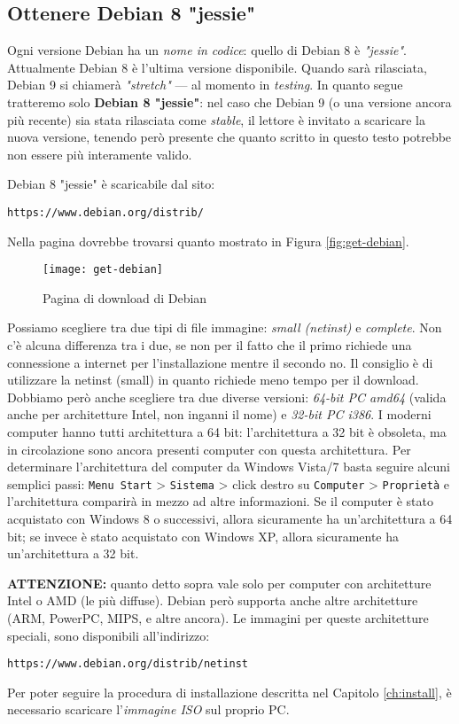\subsection{Ottenere Debian 8 "jessie"}
Ogni versione Debian ha un \textit{nome in codice}: quello di Debian 8 è \textit{"jessie"}. Attualmente Debian 8 è l'ultima versione disponibile. Quando sarà rilasciata, Debian 9 si chiamerà \textit{"stretch"} --- al momento in \textit{testing}. In quanto segue tratteremo solo \textbf{Debian 8 "jessie"}: nel caso che Debian 9 (o una versione ancora più recente) sia stata rilasciata come \textit{stable}, il lettore è invitato a scaricare la nuova versione, tenendo però presente che quanto scritto in questo testo potrebbe non essere più interamente valido.

Debian 8 "jessie" è scaricabile dal sito:

\begin{graybox}
	\texttt{https://www.debian.org/distrib/}
\end{graybox}

Nella pagina dovrebbe trovarsi quanto mostrato in Figura \vref{fig:get-debian}.

\begin{figure}[ht]
	\centering
	\texttt{[image: get-debian]}
	\caption{Pagina di download di Debian}
	\label{fig:get-debian}
\end{figure}

Possiamo scegliere tra due tipi di file immagine: \textit{small (netinst)} e \textit{complete}. Non c'è alcuna differenza tra i due, se non per il fatto che il primo richiede una connessione a internet per l'installazione mentre il secondo no. Il consiglio è di utilizzare la netinst (small) in quanto richiede meno tempo per il download. Dobbiamo però anche scegliere tra due diverse versioni: \textit{64-bit PC amd64} (valida anche per architetture Intel, non inganni il nome) e \textit{32-bit PC i386}. I moderni computer hanno tutti architettura a 64 bit: l'architettura a 32 bit è obsoleta, ma in circolazione sono ancora presenti computer con questa architettura. Per determinare l'architettura del computer da Windows Vista/7 basta seguire alcuni semplici passi: \texttt{Menu Start} > \texttt{Sistema} > click destro su \texttt{Computer} > \texttt{Proprietà} e l'architettura comparirà in mezzo ad altre informazioni. Se il computer è stato acquistato con Windows 8 o successivi, allora sicuramente ha un'architettura a 64 bit; se invece è stato acquistato con Windows XP, allora sicuramente ha un'architettura a 32 bit.

\begin{graybox}
	\textbf{ATTENZIONE:} quanto detto sopra vale solo per computer con architetture Intel o AMD (le più diffuse). Debian però supporta anche altre architetture (ARM, PowerPC, MIPS, e altre ancora). Le immagini per queste architetture speciali, sono disponibili all'indirizzo:

	\texttt{https://www.debian.org/distrib/netinst}
\end{graybox}

Per poter seguire la procedura di installazione descritta nel Capitolo \vref{ch:install}, è necessario scaricare l'\textit{immagine ISO} sul proprio PC.
